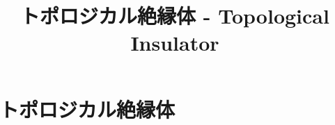 \documentclass[a4paper]{jsreport}
\title{トポロジカル絶縁体 - Topological Insulator}
\begin{document}
    \maketitle

    \tableofcontents

    \chapter{トポロジカル絶縁体}
\end{document}
